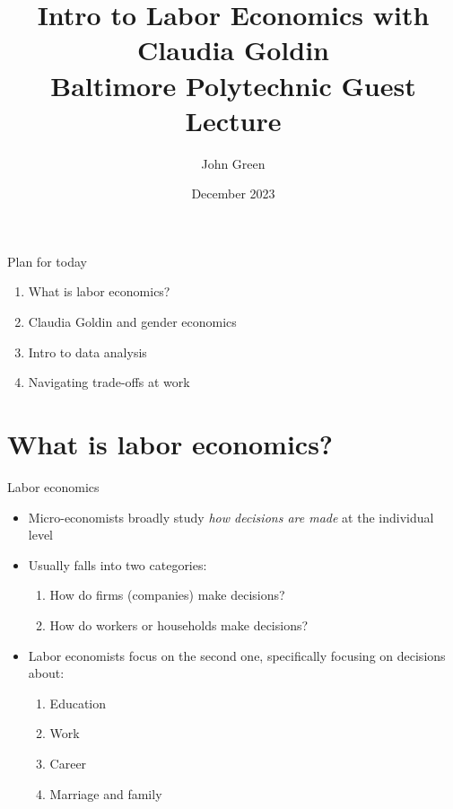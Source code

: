 \documentclass[aspectratio=169]{beamer}
\title{Intro to Labor Economics with Claudia Goldin \\ \vspace{2mm} \large Baltimore Polytechnic Guest Lecture}
\author{John Green}
\institute{\normalsize Johns Hopkins Economics} %
\date{December 2023}
\begin{document}
\begin{frame}
    \titlepage 
\end{frame}

\begin{frame}{Plan for today}

\begin{enumerate}
    \item What is labor economics? 
    \item Claudia Goldin and gender economics
    \item Intro to data analysis
    \item Navigating trade-offs at work
\end{enumerate}

\end{frame}

\section{What is labor economics?}

\begin{frame}{Labor economics}
    \begin{itemize}
        \item Micro-economists broadly study \textit{how decisions are made} at the individual level
        \item Usually falls into two categories:
        \begin{enumerate}
            \item How do firms (companies) make decisions?
            \item How do workers or households make decisions?
        \end{enumerate}
        \item Labor economists focus on the second one, specifically focusing on decisions about:
        \begin{enumerate}
            \item Education
            \item Work
            \item Career
            \item Marriage and family
        \end{enumerate}
    \end{itemize}
\end{frame}
\end{document}
